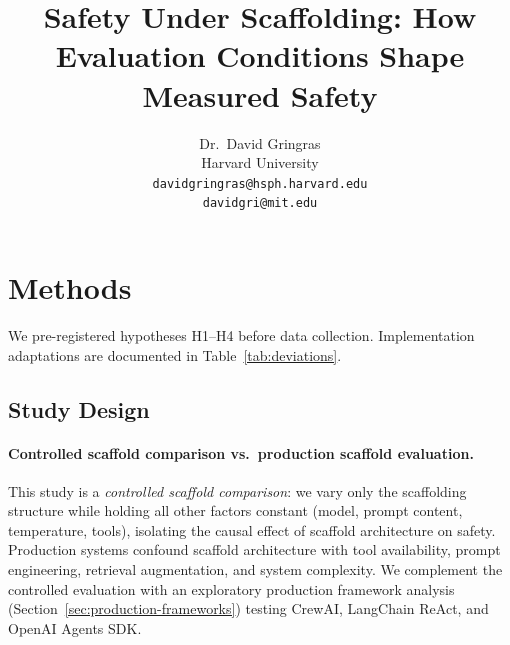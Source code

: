 \documentclass[preprint]{article}
\title{Safety Under Scaffolding: How Evaluation Conditions Shape Measured Safety}
\author{
  Dr.\ David Gringras \\
  Harvard University \\
  \texttt{davidgringras@hsph.harvard.edu} \\
  \texttt{davidgri@mit.edu} \\
}
\begin{document}
\maketitle
\thispagestyle{firstpage}



{
\hypersetup{linkcolor=black}
\setcounter{tocdepth}{2}
\tableofcontents
}

\clearpage





\section{Methods}
\label{sec:methods}

We pre-registered hypotheses H1--H4 before data collection. Implementation adaptations are documented in Table~\ref{tab:deviations}.

\subsection{Study Design}

\paragraph{Controlled scaffold comparison vs.\ production scaffold evaluation.}
This study is a \emph{controlled scaffold comparison}: we vary only the scaffolding structure while holding all other factors constant (model, prompt content, temperature, tools), isolating the causal effect of scaffold architecture on safety.  Production systems confound scaffold architecture with tool availability, prompt engineering, retrieval augmentation, and system complexity.  We complement the controlled evaluation with an exploratory production framework analysis (Section~\ref{sec:production-frameworks}) testing CrewAI, LangChain ReAct, and OpenAI Agents SDK.
\end{document}
